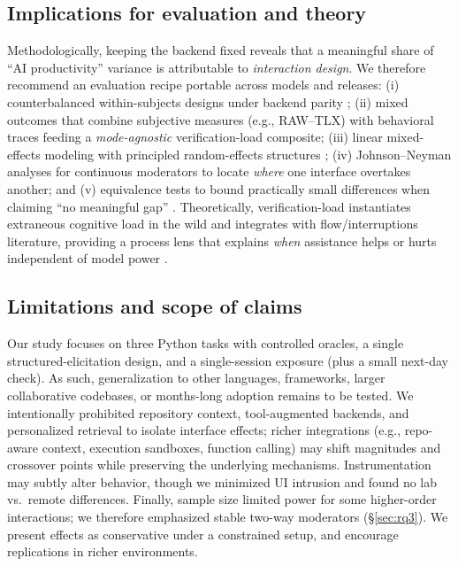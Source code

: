 \documentclass[sigconf]{acmart}
\begin{document}
\subsection{Implications for evaluation and theory}
\label{sec:discussion-eval}
Methodologically, keeping the backend fixed reveals that a meaningful share of ``AI productivity'' variance is attributable to \emph{interaction design}. We therefore recommend an evaluation recipe portable across models and releases: (i) counterbalanced within-subjects designs under backend parity \cite{williams1949experimental}; (ii) mixed outcomes that combine subjective measures (e.g., RAW--TLX) with behavioral traces feeding a \emph{mode-agnostic} verification-load composite; (iii) linear mixed-effects modeling with principled random-effects structures \cite{bates2015lme4,kuznetsova2017lmerTest}; (iv) Johnson--Neyman analyses for continuous moderators to locate \emph{where} one interface overtakes another; and (v) equivalence tests to bound practically small differences when claiming ``no meaningful gap'' \cite{preacher2006tools,bauer2005probing,lakens2017tost}. Theoretically, verification-load instantiates extraneous cognitive load in the wild and integrates with flow/interruptions literature, providing a process lens that explains \emph{when} assistance helps or hurts independent of model power \cite{sweller2019cognitive,mark2008cost}.

\subsection{Limitations and scope of claims}
Our study focuses on three Python tasks with controlled oracles, a single structured-elicitation design, and a single-session exposure (plus a small next-day check). As such, generalization to other languages, frameworks, larger collaborative codebases, or months-long adoption remains to be tested. We intentionally prohibited repository context, tool-augmented backends, and personalized retrieval to isolate interface effects; richer integrations (e.g., repo-aware context, execution sandboxes, function calling) may shift magnitudes and crossover points while preserving the underlying mechanisms. Instrumentation may subtly alter behavior, though we minimized UI intrusion and found no lab vs.\ remote differences. Finally, sample size limited power for some higher-order interactions; we therefore emphasized stable two-way moderators (\S\ref{sec:rq3}). We present effects as conservative under a constrained setup, and encourage replications in richer environments.
\end{document}
